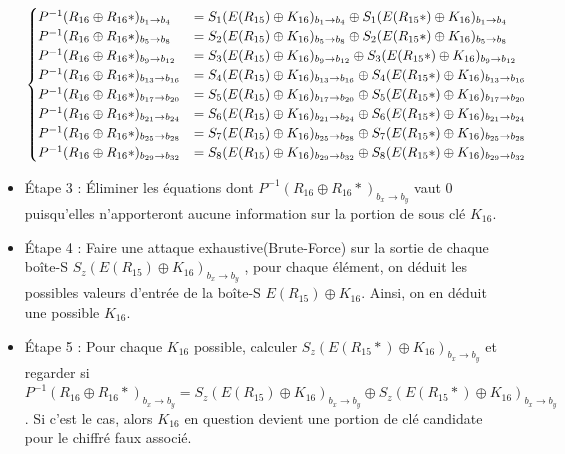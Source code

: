 \documentclass[12pt,a4paper]{report}
\begin{document}
\begin{itemize}
\[
\begin{cases}
    P^{-1}(R_{16}\oplus R_{16}*)_{b_1\to b_4} &= S_1(E(R_{15})\oplus K_{16})_{b_1\to b_4} \oplus S_1(E(R_{15}*)\oplus K_{16})_{b_1\to b_4} \\
    P^{-1}(R_{16}\oplus R_{16}*)_{b_5\to b_{8}} &= S_2(E(R_{15})\oplus K_{16})_{b_5\to b_{8}} \oplus S_2(E(R_{15}*)\oplus K_{16})_{b_5\to b_{8}} \\
    P^{-1}(R_{16}\oplus R_{16}*)_{b_{9}\to b_{12}} &= S_3(E(R_{15})\oplus K_{16})_{b_{9}\to b_{12}} \oplus S_3(E(R_{15}*)\oplus K_{16})_{b_{9}\to b_{12}} \\
    P^{-1}(R_{16}\oplus R_{16}*)_{b_{13}\to b_{16}} &= S_4(E(R_{15})\oplus K_{16})_{b_{13}\to b_{16}} \oplus S_4(E(R_{15}*)\oplus K_{16})_{b_{13}\to b_{16}} \\
    P^{-1}(R_{16}\oplus R_{16}*)_{b_{17}\to b_{20}} &= S_5(E(R_{15})\oplus K_{16})_{b_{17}\to b_{20}} \oplus S_5(E(R_{15}*)\oplus K_{16})_{b_{17}\to b_{20}} \\
    P^{-1}(R_{16}\oplus R_{16}*)_{b_{21}\to b_{24}} &= S_6(E(R_{15})\oplus K_{16})_{b_{21}\to b_{24}} \oplus S_6(E(R_{15}*)\oplus K_{16})_{b_{21}\to b_{24}} \\
    P^{-1}(R_{16}\oplus R_{16}*)_{b_{25}\to b_{28}} &= S_7(E(R_{15})\oplus K_{16})_{b_{25}\to b_{28}} \oplus S_7(E(R_{15}*)\oplus K_{16})_{b_{25}\to b_{28}} \\
    P^{-1}(R_{16}\oplus R_{16}*)_{b_{29}\to b_{32}} &= S_8(E(R_{15})\oplus K_{16})_{b_{29}\to b_{32}} \oplus S_8(E(R_{15}*)\oplus K_{16})_{b_{29}\to b_{32}}\newline
    
\end{cases}
\]

	
	 \item Étape 3 : Éliminer les équations dont $P^{-1}(R_{16}\oplus R_{16}*)_{b_x\to b_y}$ vaut $0$ puisqu'elles n'apporteront aucune information sur la portion de sous clé $K_{16}$. \newline
	
	\item Étape 4 : Faire une attaque exhaustive(Brute-Force) sur la sortie de chaque boîte-S  $S_z(E(R_{15})\oplus K_{16})_{b_{x}\to b_{y}}$ , pour chaque élément, on déduit les possibles valeurs d'entrée de la boîte-S $E(R_{15})\oplus K_{16}$. Ainsi, on en déduit une possible $K_{16}$. \newline
	
	\item Étape 5 : Pour chaque $K_{16}$ possible, calculer $S_z(E(R_{15}*)\oplus K_{16})_{b_{x}\to b_{y}}$ et regarder si $P^{-1}(R_{16}\oplus R_{16}*)_{b_{x}\to b_{y}} = S_z(E(R_{15})\oplus K_{16})_{b_{x}\to b_{y}} \oplus S_z(E(R_{15}*)\oplus K_{16})_{b_{x}\to b_{y}}$. \newline Si c'est le cas, alors $K_{16}$ en question devient une portion de clé candidate pour le chiffré faux associé. \newline 
	

\end{itemize}
\end{document}
